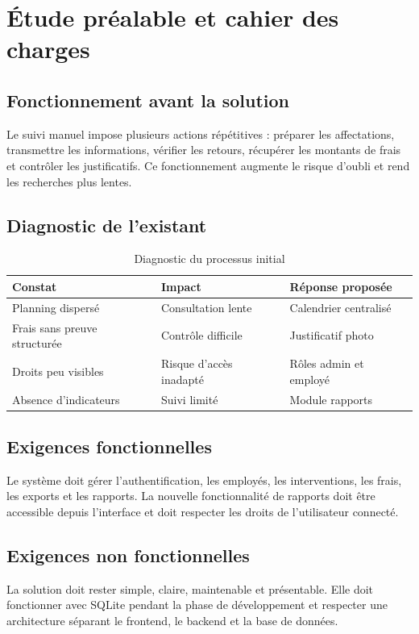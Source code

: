 \documentclass[12pt,a4paper,oneside]{report}
\begin{document}
\chapter{Étude préalable et cahier des charges}
\section{Fonctionnement avant la solution}
Le suivi manuel impose plusieurs actions répétitives : préparer les affectations, transmettre les informations, vérifier les retours, récupérer les montants de frais et contrôler les justificatifs. Ce fonctionnement augmente le risque d'oubli et rend les recherches plus lentes.

\section{Diagnostic de l'existant}
\begin{table}[H]
\centering
\caption{Diagnostic du processus initial}
\begin{tabular}{p{4cm}p{5cm}p{4cm}}
\toprule
\textbf{Constat} & \textbf{Impact} & \textbf{Réponse proposée}\\
\midrule
Planning dispersé & Consultation lente & Calendrier centralisé\\
Frais sans preuve structurée & Contrôle difficile & Justificatif photo\\
Droits peu visibles & Risque d'accès inadapté & Rôles admin et employé\\
Absence d'indicateurs & Suivi limité & Module rapports\\
\bottomrule
\end{tabular}
\end{table}

\section{Exigences fonctionnelles}
Le système doit gérer l'authentification, les employés, les interventions, les frais, les exports et les rapports. La nouvelle fonctionnalité de rapports doit être accessible depuis l'interface et doit respecter les droits de l'utilisateur connecté.

\section{Exigences non fonctionnelles}
La solution doit rester simple, claire, maintenable et présentable. Elle doit fonctionner avec SQLite pendant la phase de développement et respecter une architecture séparant le frontend, le backend et la base de données.
\end{document}
